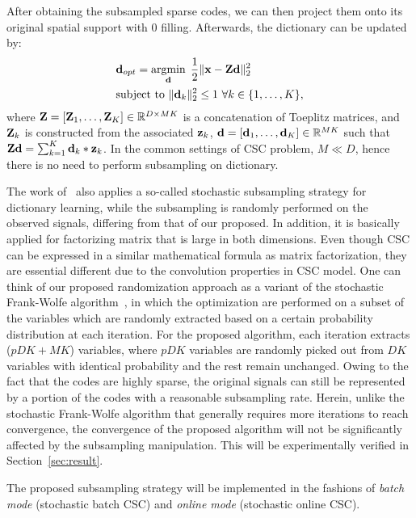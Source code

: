 After obtaining the subsampled sparse codes, we can then project them onto its original spatial support with $0$ filling. Afterwards, the dictionary can be updated by:
\begin{equation} \label{eq:updatingFilter}
\begin{split}
   & \filter_{opt} = \minimize{\filter} \frac{1}{2}\|\signal - \Code \filter \|_2^2 \\
   & \text{subject to}  ~ \|\filter_k\|^2_2 \leq 1 ~ \forall k \in \{1,\dots,K\},
\end{split}
\end{equation}
where $\Code= [\Code_1, \dots, \Code_K] \in \mathbb{R}^{D \times MK}$ is a concatenation of Toeplitz matrices, and $\Code_k$ is constructed from the associated $\code_k$, $\filter= [\filter_1,\dots,\filter_K] \in \mathbb{R}^{MK}$ such that $ \Code \filter = \sum_{k=1}^{K} \filter_k * \code_k$. In the common settings of CSC problem, $M \ll D$, hence there is no need to perform subsampling on dictionary.

The work of~\cite{mensch2016dictionary} also applies a so-called stochastic subsampling strategy for dictionary learning, while the subsampling is randomly performed on the
observed signals, differing from that of our proposed. In addition, it is basically applied for factorizing matrix that is large in both dimensions. Even though CSC can be 
expressed in a similar mathematical formula as matrix factorization, they are essential different due to the convolution properties in CSC model.
One can think of our proposed randomization approach as a variant of the stochastic Frank-Wolfe algorithm~\cite{reddi2016stochastic,pmlr-v80-kerdreux18a}, in which the optimization are performed on a subset of the variables which are randomly extracted based on a certain probability distribution at each iteration. For the proposed algorithm, each iteration extracts ($pDK+MK$) variables, where $pDK$ variables are randomly picked out from $DK$ variables with identical probability and the rest remain unchanged. Owing to the fact that the codes are highly sparse, the original signals can still be represented by a portion of the codes with a reasonable subsampling rate. Herein, unlike the stochastic Frank-Wolfe algorithm that generally requires more iterations to reach convergence, the convergence of the proposed algorithm will not be significantly affected by the subsampling manipulation. This will be experimentally verified in Section~\ref{sec:result}.

The proposed subsampling strategy will be implemented in the fashions of {\em batch mode} (stochastic batch CSC) and {\em online mode} (stochastic online CSC).

